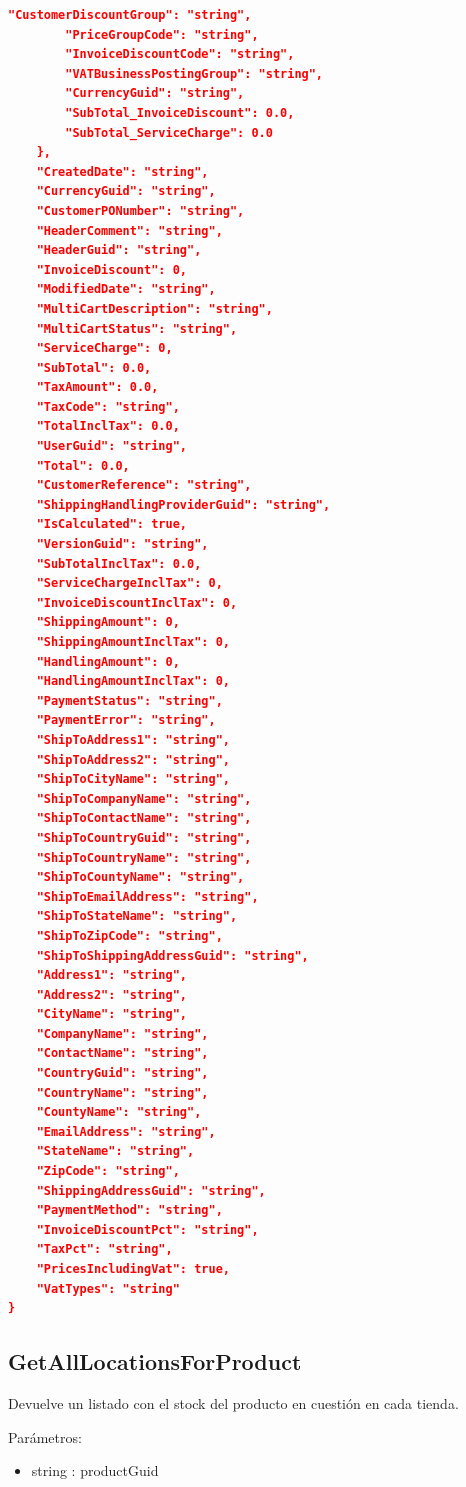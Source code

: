 \begin{lstlisting}[language=json]
        "CustomerDiscountGroup": "string",
        "PriceGroupCode": "string",
        "InvoiceDiscountCode": "string",
        "VATBusinessPostingGroup": "string",
        "CurrencyGuid": "string",
        "SubTotal_InvoiceDiscount": 0.0,
        "SubTotal_ServiceCharge": 0.0
    },
    "CreatedDate": "string",
    "CurrencyGuid": "string",
    "CustomerPONumber": "string",
    "HeaderComment": "string",
    "HeaderGuid": "string",
    "InvoiceDiscount": 0,
    "ModifiedDate": "string",
    "MultiCartDescription": "string",
    "MultiCartStatus": "string",
    "ServiceCharge": 0,
    "SubTotal": 0.0,
    "TaxAmount": 0.0,
    "TaxCode": "string",
    "TotalInclTax": 0.0,
    "UserGuid": "string",
    "Total": 0.0,
    "CustomerReference": "string",
    "ShippingHandlingProviderGuid": "string",
    "IsCalculated": true,
    "VersionGuid": "string",
    "SubTotalInclTax": 0.0,
    "ServiceChargeInclTax": 0,
    "InvoiceDiscountInclTax": 0,
    "ShippingAmount": 0,
    "ShippingAmountInclTax": 0,
    "HandlingAmount": 0,
    "HandlingAmountInclTax": 0,
    "PaymentStatus": "string",
    "PaymentError": "string",
    "ShipToAddress1": "string",
    "ShipToAddress2": "string",
    "ShipToCityName": "string",
    "ShipToCompanyName": "string",
    "ShipToContactName": "string",
    "ShipToCountryGuid": "string",
    "ShipToCountryName": "string",
    "ShipToCountyName": "string",
    "ShipToEmailAddress": "string",
    "ShipToStateName": "string",
    "ShipToZipCode": "string",
    "ShipToShippingAddressGuid": "string",
    "Address1": "string",
    "Address2": "string",
    "CityName": "string",
    "CompanyName": "string",
    "ContactName": "string",
    "CountryGuid": "string",
    "CountryName": "string",
    "CountyName": "string",
    "EmailAddress": "string",
    "StateName": "string",
    "ZipCode": "string",
    "ShippingAddressGuid": "string",
    "PaymentMethod": "string",
    "InvoiceDiscountPct": "string",
    "TaxPct": "string",
    "PricesIncludingVat": true,
    "VatTypes": "string"
}
\end{lstlisting}

\subsection{GetAllLocationsForProduct}
Devuelve un listado con el stock del producto en cuestión en cada tienda.

Parámetros:
\begin{itemize}
	\item string : productGuid
\end{itemize}

